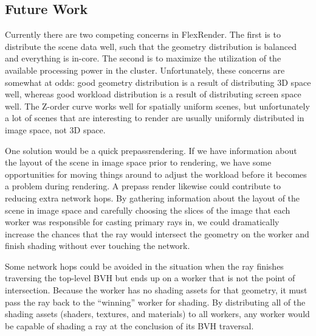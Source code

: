 \documentclass[a4paper,twoside]{article}
\begin{document}
\subsection{Future Work}
\label{futurework}

Currently there are two competing concerns in FlexRender. The first is to
distribute the scene data well, such that the geometry distribution is balanced
and everything is in-core. The second is to maximize
the utilization of the available processing power in the cluster. Unfortunately,
these concerns are somewhat at odds: good geometry distribution
is a result of distributing 3D space well, whereas good workload distribution
is a result of distributing screen space well. 
The Z-order curve works well for spatially uniform scenes, but unfortunately a
lot of scenes that are interesting to render are usually uniformly distributed
in image space, not 3D space. 

One solution would be a quick prepassrendering. If we have information about the
layout of the scene in image space prior to rendering, we have some opportunities
for moving things around to adjust the workload before it becomes a problem during
rendering. A prepass render likewise could contribute to reducing extra network hops.
By gathering information about the
layout of the scene in image space and carefully choosing the slices of the
image that each worker was responsible for casting primary rays in, we could
dramatically increase the chances that the ray would intersect the geometry
on the worker and finish shading without ever touching the network. 

Some network hops could be avoided in the situation when the ray finishes
traversing the top-level BVH but ends up on a worker that is not the point of
intersection. Because the worker has no shading assets for that geometry, it
must pass the ray back to the ``winning'' worker for shading. By distributing
all of the shading assets (shaders, textures, and materials) to all workers,
any worker would be capable of shading a ray at the conclusion of its BVH traversal.
\end{document}
